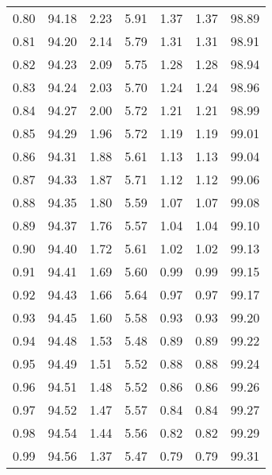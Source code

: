 \begin{tabular}{|c|c|c|c|c|c|c|}
      0.80 &     94.18 &      2.23 &       5.91 &    1.37 &       1.37 &         98.89 \\
      0.81 &     94.20 &      2.14 &       5.79 &    1.31 &       1.31 &         98.91 \\
      0.82 &     94.23 &      2.09 &       5.75 &    1.28 &       1.28 &         98.94 \\
      0.83 &     94.24 &      2.03 &       5.70 &    1.24 &       1.24 &         98.96 \\
      0.84 &     94.27 &      2.00 &       5.72 &    1.21 &       1.21 &         98.99 \\
      0.85 &     94.29 &      1.96 &       5.72 &    1.19 &       1.19 &         99.01 \\
      0.86 &     94.31 &      1.88 &       5.61 &    1.13 &       1.13 &         99.04 \\
      0.87 &     94.33 &      1.87 &       5.71 &    1.12 &       1.12 &         99.06 \\
      0.88 &     94.35 &      1.80 &       5.59 &    1.07 &       1.07 &         99.08 \\
      0.89 &     94.37 &      1.76 &       5.57 &    1.04 &       1.04 &         99.10 \\
      0.90 &     94.40 &      1.72 &       5.61 &    1.02 &       1.02 &         99.13 \\
      0.91 &     94.41 &      1.69 &       5.60 &    0.99 &       0.99 &         99.15 \\
      0.92 &     94.43 &      1.66 &       5.64 &    0.97 &       0.97 &         99.17 \\
      0.93 &     94.45 &      1.60 &       5.58 &    0.93 &       0.93 &         99.20 \\
      0.94 &     94.48 &      1.53 &       5.48 &    0.89 &       0.89 &         99.22 \\
      0.95 &     94.49 &      1.51 &       5.52 &    0.88 &       0.88 &         99.24 \\
      0.96 &     94.51 &      1.48 &       5.52 &    0.86 &       0.86 &         99.26 \\
      0.97 &     94.52 &      1.47 &       5.57 &    0.84 &       0.84 &         99.27 \\
      0.98 &     94.54 &      1.44 &       5.56 &    0.82 &       0.82 &         99.29 \\
      0.99 &     94.56 &      1.37 &       5.47 &    0.79 &       0.79 &         99.31 \\
\bottomrule
\end{tabular}
